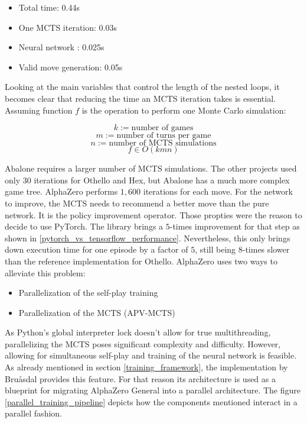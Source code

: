 \begin{itemize}
    \item Total time: 0.44s
    \item One MCTS iteration: 0.03s
    \item Neural network : 0.025s
    \item Valid move generation: 0.05s
\end{itemize}

Looking at the main variables that control the length of the nested loops, it becomes clear that reducing the time an MCTS iteration takes is essential. Assuming function $f$ is the operation to perform one Monte Carlo simulation:

$$
    k := \text{number of games}
$$
$$
    m := \text{number of turns per game}
$$
$$
    n := \text{number of MCTS simulations}
$$
$$
    f \in O(kmn)
$$

Abalone requires a larger number of MCTS simulations. The other projects \cite{bruasdal_deep_2020,thakoor_learning_nodate} used only 30 iterations for Othello and Hex, but Abalone has a much more complex game tree. AlphaZero performs $1,600$ iterations \cite[p. 11]{silver_mastering_2017} for each move. For the network to improve, the MCTS needs to recommend a better move than the pure network. It is the policy improvement operator. Those propties were the reason to decide to use PyTorch. The library brings a $5$-times improvement for that step as shown in \ref{pytorch_vs_tensorflow_performance}. Nevertheless, this only brings down execution time for one episode by a factor of $5$, still being $8$-times slower than the reference implementation for Othello. AlphaZero uses two ways to alleviate this problem:

\begin{itemize}
    \item Parallelization of the self-play training
    \item Parallelization of the MCTS (APV-MCTS)
\end{itemize}

As Python's global interpreter lock \cite{noauthor_globalinterpreterlock_nodate} doesn't allow for true multithreading, parallelizing the MCTS poses significant complexity and difficulty. However, allowing for simultaneous self-play and training of the neural network is feasible. As already mentioned in section \ref{training_framework}, the implementation by Bruåsdal \cite{bruasdal_deep_2020} provides this feature. For that reason its architecture is used as a blueprint for migrating AlphaZero General into a parallel architecture. The figure \ref{parallel_training_pipeline} depicts how the components mentioned interact in a parallel fashion.

